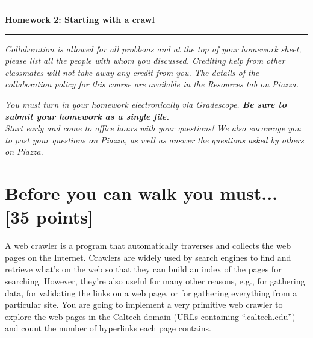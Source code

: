 \documentclass[11pt]{article}
\begin{document}
\noindent \rule{\textwidth}{.5mm} \noindent {}  \hfill  {}

\noindent \centerline{\bf {\Large Homework 2: Starting with a crawl}}

\noindent {}  \hfill
{} \noindent
\rule{\textwidth}{.5mm}


\noindent \textit{Collaboration is allowed for all problems and at the top of your homework sheet, please list all the people
with whom you discussed. Crediting help from other classmates will not take away any credit from you.
The details of the collaboration policy for this course are available in the Resources tab on Piazza.\\}

\noindent\textit{You must turn in your homework electronically via Gradescope. \textbf{Be sure to submit your homework as a single file.} }\\

\noindent\textit{Start early and come to office hours with your questions! We also encourage you to post your questions on Piazza, as well as answer the questions asked by others on Piazza.}

\section{Before you can walk you must... [35 points]}
\label{prob:crawler}


A web crawler is a program that automatically traverses and collects
the web pages on the Internet.  Crawlers are widely used by search
engines to find and retrieve what's on the web so that they can build
an index of the pages for searching. However, they're also useful for
many other reasons, e.g., for gathering data, for validating the links
on a web page, or for gathering everything from a particular site. You
are going to implement a very primitive web crawler to explore the web
pages in the Caltech domain (URLs containing ``.caltech.edu'') and
count the number of hyperlinks each page contains.
\end{document}
